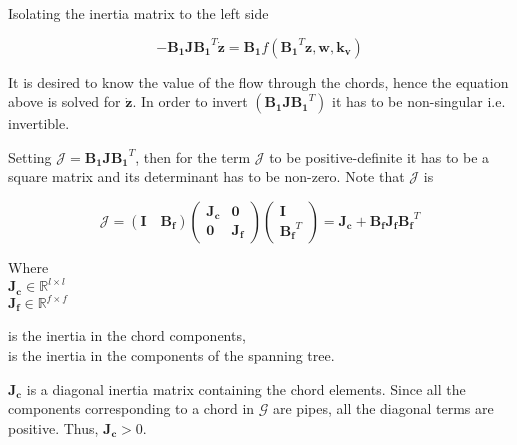 Isolating the inertia matrix to the left side

\begin{equation}
 - \bm{B_1} \bm{J} \bm{{B_1}}^T \bm{\dot{z}}  = \bm{B_1} f({\bm{B_1}}^T \bm{z}, \bm{w}, \bm{k_v})
 \label{isolateZ}
 \end{equation}

It is desired to know the value of the flow through the chords, hence the equation above is solved 
for $\bm{\dot{z}}$. In order to invert $(\bm{B_1 J} \bm{{B_1}}^T)$ it has to be non-singular i.e. invertible. 

Setting $\bm{\mathcal{J}} = \bm{B_1 J} \bm{{B_1}}^T $, then for the term $\bm{\mathcal{J}}$ to be positive-definite it has to be a square matrix and its 
determinant has to be non-zero. Note that $\bm{\mathcal{J}}$ is

\begin{equation}
  \label{Jequation}
  \bm{\mathcal{J}} = (\bm{I \quad B_f}) 
  \begin{pmatrix}
    \bm{J_c}    &    \bm{0 }   \\
    \bm{0}       &   \bm{ J_f}
  \end{pmatrix}
  \begin{pmatrix}
    \bm{I}    \\
    \bm{{B_f}}^T
  \end{pmatrix}
  = \bm{J_c} + \bm{B_f J_f} \bm{{B_f}}^T
\end{equation}

\begin{minipage}[t]{0.20\textwidth}
Where\\
\hspace*{8mm} $\bm{J_c} \in \mathbb{R}^{l \times l}$  \\
\hspace*{8mm} $\bm{J_f} \in \mathbb{R}^{f \times f} $ 
\end{minipage}
\begin{minipage}[t]{0.68\textwidth}
\vspace*{2mm}
\hspace*{4mm} is the inertia in the chord components,\\
\hspace*{4mm} is the inertia in the components of the spanning tree.
\end{minipage}

$\bm{J_c}$ is a diagonal inertia matrix containing the chord elements. Since all the components corresponding to a chord in $\bm{\mathcal{G}}$ are pipes, all the 
diagonal terms are positive. Thus, $\bm{J_c} > 0$. 

